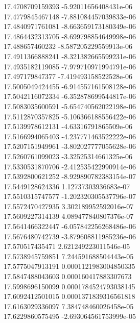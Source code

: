 {17.4708709159393 -5.92011656408431e-06 \\
17.4779845467148 -7.881084457039833e-06 \\
17.4840971761081 -8.663659173180349e-06 \\
17.4864432313705 -8.699798854649998e-06 \\
17.488657460232 -8.587205229559913e-06 \\
17.4911366888241 -8.321382665599231e-06 \\
17.4935182119085 -7.979710971994791e-06 \\
17.497179847377 -7.419493158522528e-06 \\
17.5005049424455 -6.914557161508128e-06 \\
17.5042116072334 -6.352878699544817e-06 \\
17.5083035600591 -5.654740562022198e-06 \\
17.5112870357825 -5.106366188556422e-06 \\
17.5139978612131 -4.63316791865509e-06 \\
17.5166994065403 -4.237771463522222e-06 \\
17.5207151949961 -3.802027777055628e-06 \\
17.5260761099023 -3.32525314661325e-06 \\
17.5330531870706 -2.412535422990914e-06 \\
17.5392800621252 -8.929890782383154e-07 \\
17.5449128624336 1.12737303936683e-07 \\
17.5510315747577 -1.202320305537796e-07 \\
17.5572470427935 3.302189952592016e-07 \\
17.5609227314139 4.089477840807376e-07 \\
17.5641466322447 -6.057842256268486e-06 \\
17.5676480742739 -3.879608811985236e-06 \\
17.570517435471 2.621249223011546e-05 \\
17.5738945759851 7.244591688504443e-05 \\
17.5775047913191 0.0001121983004850335 \\
17.5847488043603 0.000160417883307673 \\
17.5998696150099 0.0001784524793038145 \\
17.6092412501015 0.0001371839316561818 \\
17.6163029336097 7.384748460026458e-05 \\
17.6229860575495 -2.693064561753999e-05 \\
}
